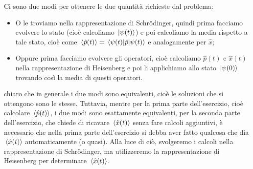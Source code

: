 \begin{soluzione}
   Ci sono due modi per ottenere le due quantità richieste dal problema:
   \begin{itemize}
      \item O le troviamo nella rappresentazione di Schrödinger, quindi prima facciamo evolvere lo stato (cioè calcoliamo $\ket*{\psi(t)}$) e poi calcoliamo la media rispetto a tale stato, cioè come $\expval*{\hat{p}(t)}=\mel*{\psi(t)}{\hat{p}}{\psi(t)}$ e analogamente per $\hat{x}$;
      \item Oppure prima facciamo evolvere gli operatori, cioè calcoliamo $\hat{p}(t)$ e $\hat{x}(t)$ nella rappresentazione di Heisenberg e poi li applichiamo allo stato $\ket*{\psi(0)}$ trovando così la media di questi operatori.
   \end{itemize}
   \E chiaro che in generale i due modi sono equivalenti, cioè le soluzioni che si ottengono sono le stesse. Tuttavia, mentre per la prima parte dell'esercizio, cioè calcolare $\expval*{\hat{p}(t)}$, i due modi sono esattamente equivalenti, per la seconda parte dell'esercizio, che chiede di ricavare $\expval*{\hat{x}(t)}$ senza fare calcoli aggiuntivi, è necessario che nella prima parte dell'esercizio si debba aver fatto qualcosa che dia $\expval*{\hat{x}(t)}$ automaticamente (o quasi). Alla luce di ciò, svolgeremo i calcoli nella rappresentazione di Schr\"{o}dinger, ma utilizzeremo la rappresentazione di Heisenberg per determinare $\expval*{\hat{x}(t)}$.\\
   

\end{soluzione}
